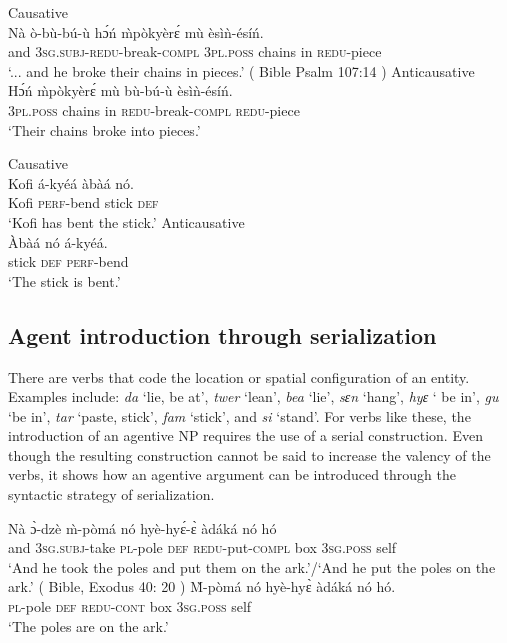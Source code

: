 \documentclass[output=paper]{langsci/langscibook}
\begin{document}
\ea\label{ex:42.osam}
\ea\label{ex:42a.osam} Causative \\
\gll  Nà  ò-bù-bú-ù      hɔ́ń    \`{m}pòkyèr\'{ɛ}  mù   èsìǹ-ésíń.\\
     and  \textsc{3sg.subj}-\textsc{redu}-break-\textsc{compl}  \textsc{3pl.poss}  chains    in  \textsc{redu}-piece\\
\glt `... and he broke their chains in pieces.' ( Bible Psalm 107:14 \citep{bible1974})
\ex\label{ex:42b.osam} Anticausative\\
\gll Hɔ́ń  \`{m}pòkyèr\'{ɛ}   mù  bù-bú-ù     èsìǹ-ésíń.\\
     \textsc{3pl.poss}  chains    in  \textsc{redu}-break-\textsc{compl}  \textsc{redu}-piece\\
\glt `Their chains broke into pieces.'
\z 
\z 


\ea\label{ex:43.osam}
\ea\label{ex:43a.osam} Causative \\
\gll Kofi  á-kyéá    àbàá  nó.\\
     Kofi  \textsc{perf}-bend  stick  \textsc{def}\\
\glt `Kofi has bent the stick.'
\ex\label{ex:43b.osam} Anticausative \\
\gll Àbàá  nó  á-kyéá.\\
     stick  \textsc{def}  \textsc{perf}-bend\\
\glt `The stick is bent.'
\z 
\z 


\subsection{Agent introduction through serialization}\label{§5.2:agent.osam}

There are verbs that code the location or spatial configuration of an entity. Examples  include: \textit{da} `lie, be at', \textit{twer} `lean', \textit{bea} `lie', \textit{sɛn} `hang', \textit{hyɛ} ` be in', \textit{gu} `be in', \textit{tar} `paste, stick', \textit{fam} `stick', and \textit{si} `stand'. For verbs like these, the introduction of an agentive NP requires the use of a serial construction. Even though the resulting construction cannot be said to increase the valency of the verbs, it shows how an agentive argument can be introduced through the syntactic strategy of serialization.

\ea\label{ex:44.osam}
\ea\label{ex:44a.osam}
\gll  Nà  ɔ̀-dzè     \`{m}-pòmá   nó  hyè-hy\'{ɛ}-\`{ɛ}  àdáká     nó    hó \\
             and  \textsc{3sg.subj}-take  \textsc{pl}-pole    \textsc{def}  \textsc{redu}-put-\textsc{compl} box    \textsc{3sg.poss}  self  \\
\glt  `And he took the poles and put them on the ark.'/`And he put the poles on the ark.' ( Bible, Exodus 40: 20 \citep{bible1974})
\ex\label{ex:44b.osam}
\gll    \`{M}-pòmá   nó   hyè-hy\`{ɛ}   àdáká  nó    hó.\\
       \textsc{pl}-pole    \textsc{def}  \textsc{redu-cont}  box  \textsc{3sg.poss}  self  \\
\glt   `The poles are on the ark.'
\z 
\z 
\end{document}
